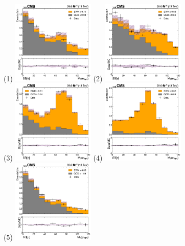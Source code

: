 \begin{figure}
  \centering
  \subfigure(1) \includegraphics[width=0.35\textwidth]{template_fit/2018/mt_low_Electron_15.0.png} \hfill
  \subfigure(2) \includegraphics[width=0.35\textwidth]{template_fit/2018/mt_low_Electron_20.0.png} \\
  \subfigure(3) \includegraphics[width=0.35\textwidth]{template_fit/2018/mt_high_Electron_25.0.png} \hfill
  \subfigure(4) \includegraphics[width=0.35\textwidth]{template_fit/2018/mt_high_Electron_45.0.png} \\
  \subfigure(5) \includegraphics[width=0.35\textwidth]{template_fit/2018/mt_low_Muon_15.0.png} \hfill

\end{figure}
